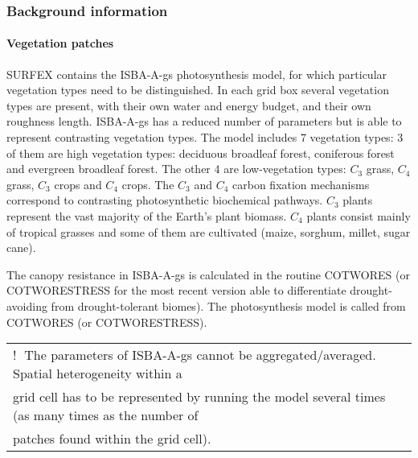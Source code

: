 {%
\subsubsection{Background information}
\label{sec1.2}

\paragraph{Vegetation patches} 

SURFEX contains the ISBA-A-gs photosynthesis model, for which particular vegetation types need to
be distinguished. In each grid box several vegetation types are present, with their own water and
energy budget, and their own roughness length. ISBA-A-gs has a reduced number of parameters but
is able to represent contrasting vegetation types. The model includes 7 vegetation types: 3 of them are
high vegetation types: deciduous broadleaf forest, coniferous forest and evergreen broadleaf forest.
The other 4 are low-vegetation types: $C_{3}$ grass, $C_{4}$ grass, $C_{3}$ crops and $C_{4}$ crops. The $C_{3}$ and $C_{4}$
carbon fixation mechanisms correspond to contrasting photosynthetic biochemical pathways. $C_{3}$ plants
represent the vast majority of the Earth’s plant biomass. $C_{4}$ plants consist mainly of tropical grasses
and some of them are cultivated (maize, sorghum, millet, sugar cane).

The canopy resistance in ISBA-A-gs is calculated in the routine COTWORES (or COTWORESTRESS
for the most recent version able to differentiate drought-avoiding from drought-tolerant biomes). The
photosynthesis model is called from COTWORES (or COTWORESTRESS).


{\bf{
			\begin{center}
			\begin{tabular}{|l|}
\hline
 \textcircled{!} The parameters of ISBA-A-gs cannot be aggregated/averaged. Spatial heterogeneity within a   \\
 grid cell has to be represented by running the model several times (as many times as the number of   \\
 patches found within the grid cell).  \\
\hline
			\end{tabular}
			\end{center}

}}}
